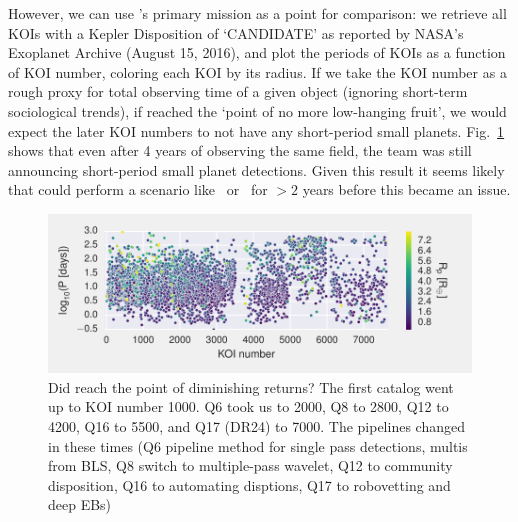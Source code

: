 However, we can use \kepler's primary mission as a point for comparison: we retrieve all KOIs with a Kepler Disposition of `CANDIDATE' as reported by NASA's Exoplanet Archive (August 15, 2016), and plot the periods of KOIs as a function of KOI number, coloring each KOI by its radius.
If we take the KOI number as a rough proxy for total observing time of a given \kepler object (ignoring short-term sociological trends), if \kepler reached the `point of no more low-hanging fruit', we would expect the later KOI numbers to not have any short-period small planets.
Fig.~\ref{fig:kepler_diminishing} shows that even after 4 years of observing the same field, the \kepler team was still announcing short-period small planet detections.
Given this result it seems likely that \tess could perform a scenario like \nhemi\ or \npole\ for $>2$ years before this became an issue.
\begin{figure}
	\centering
	\includegraphics[scale=1.]{figures/kepler_diminishing.pdf}
	\caption{ Did \kepler reach the point of diminishing returns? The first catalog went up to KOI number 1000. Q6 took us to 2000, Q8 to 2800, Q12 to 4200, Q16 to 5500, and Q17 (DR24) to 7000.
		The pipelines changed in these times (Q6 pipeline method for single pass detections, multis from BLS, Q8 switch to multiple-pass wavelet, Q12 to community disposition, Q16 to automating disptions, Q17 to robovetting and deep EBs)}
	\label{fig:kepler_diminishing}
\end{figure}


